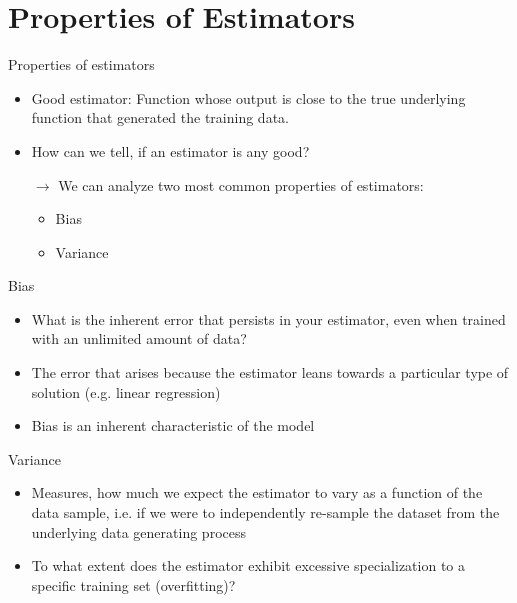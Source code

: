 \documentclass[dvipsnames]{beamer}
\begin{document}
		\section{Properties of Estimators}
		\begin{frame}{Properties of estimators}
		\begin{itemize}
				\item Good estimator: Function whose output is close to the true underlying function that generated the training data. \pause
				\item How can we tell, if an estimator is any good?
				\item[$\rightarrow$] We can analyze two most common properties of estimators:
				\begin{itemize}
					\item Bias
					\item Variance
				\end{itemize}
			\end{itemize}
    \end{frame}
			\begin{frame}{Bias}
		\begin{itemize}
				\item What is the inherent error that persists in your estimator, even when trained with an unlimited amount of data?
				\item The error that arises because the estimator leans towards a particular type of solution (e.g. linear regression)
				\item Bias is an inherent characteristic of the model
			\end{itemize}
    \end{frame}
		\begin{frame}{Variance}
		\begin{itemize}
				\item Measures, how much we expect the estimator to vary as a function of the data sample, i.e. if we were to independently re-sample the dataset from the underlying data generating process
				\item To what extent does the estimator exhibit excessive specialization to a specific training set (overfitting)?
			\end{itemize}
    \end{frame}
\end{document}
